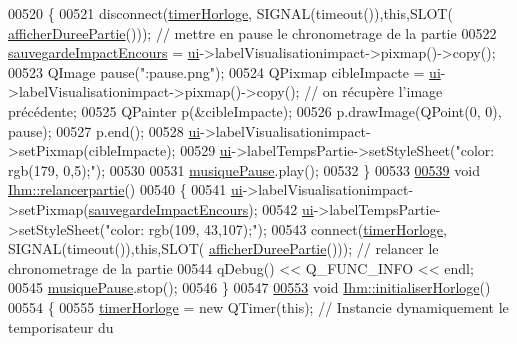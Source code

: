 \begin{DoxyCode}
00520 \{
00521     disconnect(\hyperlink{class_ihm_a21ea35b212966fa2805241ea6237d351}{timerHorloge}, SIGNAL(timeout()),\textcolor{keyword}{this},SLOT(
      \hyperlink{class_ihm_a808bd550b877499a38419a492595822e}{afficherDureePartie}())); \textcolor{comment}{// mettre en pause le chronometrage de la partie}
00522     \hyperlink{class_ihm_a659c67bf5d1ba3104fb10f23d8b91b37}{sauvegardeImpactEncours} = \hyperlink{class_ihm_a0ac5f47856566ceeeca1720109bf70ea}{ui}->labelVisualisationimpact->pixmap()->copy();
00523     QImage pause(\textcolor{stringliteral}{":pause.png"});
00524     QPixmap cibleImpacte = \hyperlink{class_ihm_a0ac5f47856566ceeeca1720109bf70ea}{ui}->labelVisualisationimpact->pixmap()->copy(); \textcolor{comment}{// on récupère l'image
       précédente;}
00525     QPainter p(&cibleImpacte);
00526     p.drawImage(QPoint(0, 0), pause);
00527     p.end();
00528     \hyperlink{class_ihm_a0ac5f47856566ceeeca1720109bf70ea}{ui}->labelVisualisationimpact->setPixmap(cibleImpacte);
00529     \hyperlink{class_ihm_a0ac5f47856566ceeeca1720109bf70ea}{ui}->labelTempsPartie->setStyleSheet(\textcolor{stringliteral}{"color: rgb(179, 0,5);"});
00530 
00531     \hyperlink{class_ihm_a11e7ae529b6adb7ac98f1aa512172ff2}{musiquePause}.play();
00532 \}
00533 
\hyperlink{class_ihm_a3480957ba23548b30dddc717f6cfa577}{00539} \textcolor{keywordtype}{void} \hyperlink{class_ihm_a3480957ba23548b30dddc717f6cfa577}{Ihm::relancerpartie}()
00540 \{
00541     \hyperlink{class_ihm_a0ac5f47856566ceeeca1720109bf70ea}{ui}->labelVisualisationimpact->setPixmap(\hyperlink{class_ihm_a659c67bf5d1ba3104fb10f23d8b91b37}{sauvegardeImpactEncours});
00542     \hyperlink{class_ihm_a0ac5f47856566ceeeca1720109bf70ea}{ui}->labelTempsPartie->setStyleSheet(\textcolor{stringliteral}{"color: rgb(109, 43,107);"});
00543     connect(\hyperlink{class_ihm_a21ea35b212966fa2805241ea6237d351}{timerHorloge}, SIGNAL(timeout()),\textcolor{keyword}{this},SLOT(
      \hyperlink{class_ihm_a808bd550b877499a38419a492595822e}{afficherDureePartie}())); \textcolor{comment}{// relancer le chronometrage de la partie}
00544     qDebug() << Q\_FUNC\_INFO << endl;
00545     \hyperlink{class_ihm_a11e7ae529b6adb7ac98f1aa512172ff2}{musiquePause}.stop();
00546 \}
00547 
\hyperlink{class_ihm_aa5a3e97de39e919ea8807d30167da510}{00553} \textcolor{keywordtype}{void} \hyperlink{class_ihm_aa5a3e97de39e919ea8807d30167da510}{Ihm::initialiserHorloge}()
00554 \{
00555     \hyperlink{class_ihm_a21ea35b212966fa2805241ea6237d351}{timerHorloge} = \textcolor{keyword}{new} QTimer(\textcolor{keyword}{this}); \textcolor{comment}{// Instancie dynamiquement le temporisateur du
}
\end{DoxyCode}
